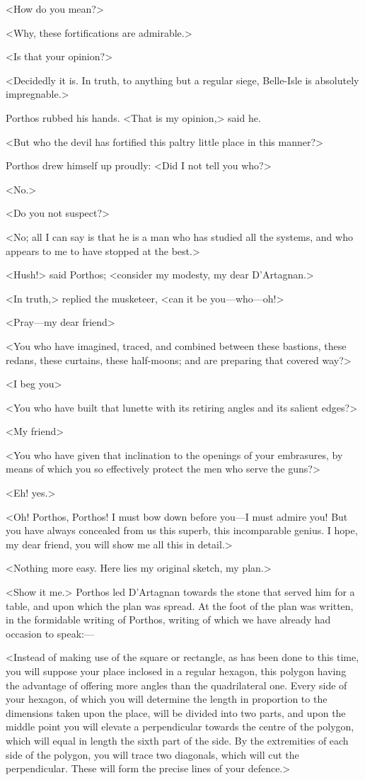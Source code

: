 <How do you mean?>

<Why, these fortifications are admirable.>

<Is that your opinion?>

<Decidedly it is. In truth, to anything but a regular siege, Belle-Isle is absolutely impregnable.>

Porthos rubbed his hands. <That is my opinion,> said he.

<But who the devil has fortified this paltry little place in this manner?>

Porthos drew himself up proudly: <Did I not tell you who?>

<No.>

<Do you not suspect?>

<No; all I can say is that he is a man who has studied all the systems, and who appears to me to have stopped at the best.>

<Hush!> said Porthos; <consider my modesty, my dear D'Artagnan.>

<In truth,> replied the musketeer, <can it be you—who—oh!>

<Pray—my dear friend\longdash>

<You who have imagined, traced, and combined between these bastions, these redans, these curtains, these half-moons; and are preparing that covered way?>

<I beg you\longdash>

<You who have built that lunette with its retiring angles and its salient edges?>

<My friend\longdash>

<You who have given that inclination to the openings of your embrasures, by means of which you so effectively protect the men who serve the guns?>

<Eh!  yes.>

<Oh! Porthos, Porthos! I must bow down before you—I must admire you! But you have always concealed from us this superb, this incomparable genius. I hope, my dear friend, you will show me all this in detail.>

<Nothing more easy. Here lies my original sketch, my plan.>

<Show it me.> Porthos led D'Artagnan towards the stone that served him for a table, and upon which the plan was spread. At the foot of the plan was written, in the formidable writing of Porthos, writing of which we have already had occasion to speak:—

<Instead of making use of the square or rectangle, as has been done to this time, you will suppose your place inclosed in a regular hexagon, this polygon having the advantage of offering more angles than the quadrilateral one. Every side of your hexagon, of which you will determine the length in proportion to the dimensions taken upon the place, will be divided into two parts, and upon the middle point you will elevate a perpendicular towards the centre of the polygon, which will equal in length the sixth part of the side. By the extremities of each side of the polygon, you will trace two diagonals, which will cut the perpendicular. These will form the precise lines of your defence.>

